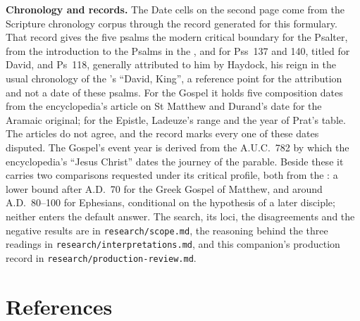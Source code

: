 {\textbf{Chronology and records.} The Date cells on the second page come from
the Scripture chronology corpus through the record generated for this
formulary. That record gives the five psalms the modern critical boundary for
the Psalter, from the introduction to the Psalms in the , and for Pss~137 and 140, titled for David, and
Ps~118, generally attributed to him by Haydock, his reign
in the usual chronology of the 's ``David, King'',
a reference point for the attribution and not a date of these psalms. For the Gospel
it holds five composition dates from the encyclopedia's article on St Matthew
and Durand's date for the Aramaic original; for the Epistle, Ladeuze's range
and the year of Prat's table. The articles do not agree, and the record marks
every one of these dates disputed. The Gospel's event year is derived from the
A.U.C.~782 by which the encyclopedia's ``Jesus Christ'' dates the journey of
the parable. Beside these it carries two
comparisons requested under its critical profile, both from the : a lower bound after A.D.~70 for the Greek
Gospel of Matthew, and around A.D.~80--100 for Ephesians, conditional on the
hypothesis of a later disciple; neither enters the default answer.
The search, its loci, the disagreements and the negative results are in
\texttt{research/scope.md}, the reasoning behind the three readings in
\texttt{research/interpretations.md}, and this companion's production record in
\texttt{research/production-review.md}.
\par}

\section*{References}


